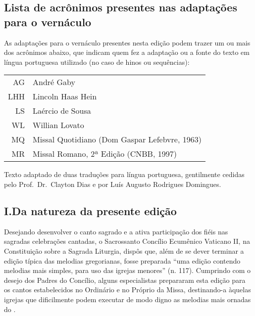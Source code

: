 \subsection{Lista de acrônimos presentes nas adaptações para o vernáculo}

As adaptações para o vernáculo presentes nesta edição podem trazer um ou mais dos acrônimos abaixo, que indicam quem fez a adaptação ou a fonte do texto em língua portuguesa utilizado (no caso de hinos ou sequências):

\begin{center}
  \begin{tabular}{rl}
    AG  & André Gaby                                    \\
    LHH & Lincoln Haas Hein                             \\
    LS  & Laércio de Sousa                              \\
    WL  & Willian Lovato                                \\
    MQ  & Missal Quotidiano (Dom Gaspar Lefebvre, 1963) \\
    MR  & Missal Romano, 2ª Edição (CNBB, 1997)         \\
  \end{tabular}
\end{center}

\label{section:praenotanda}

\begin{center}
  \begin{rubrica}
    Texto adaptado de duas traduções para língua portuguesa, gentilmente cedidas pelo Prof.\ Dr.\ Clayton Dias e por Luís Augusto Rodrigues Domingues.
  \end{rubrica}
\end{center}

\subsection{I.\@ Da natureza da presente edição}\label{subsection:praenotanda-1}

 Desejando desenvolver o canto sagrado e a ativa participação dos fiéis nas sagradas celebrações cantadas, o Sacrossanto Concílio Ecumênico Vaticano II, na Constituição sobre a Sagrada Liturgia, dispôs que, além de se dever terminar a edição típica das melodias gregorianas, fosse preparada ``uma edição contendo melodias mais simples, para uso das igrejas menores'' (n. 117). Cumprindo com o desejo dos Padres do Concílio, alguns especialistas prepararam esta edição para os cantos estabelecidos no  Ordinário e no Próprio da Missa, destinando-a àquelas igrejas que dificilmente podem executar de modo digno as melodias mais ornadas do {\GR}.

